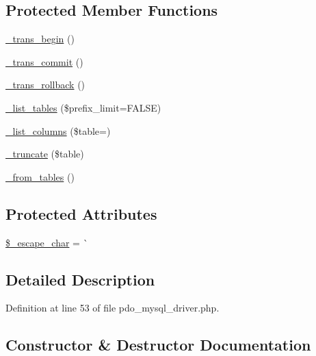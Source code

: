 \subsection*{Protected Member Functions}
\begin{DoxyCompactItemize}
\item 
\mbox{\hyperlink{class_c_i___d_b__pdo__mysql__driver_ac81ac882c1d54347d810199a15856aac}{\+\_\+trans\+\_\+begin}} ()
\item 
\mbox{\hyperlink{class_c_i___d_b__pdo__mysql__driver_a6fe7f373e0b11cfae23a5f41c0b35dda}{\+\_\+trans\+\_\+commit}} ()
\item 
\mbox{\hyperlink{class_c_i___d_b__pdo__mysql__driver_ad49a116b0776c26b53114c9093fd102a}{\+\_\+trans\+\_\+rollback}} ()
\item 
\mbox{\hyperlink{class_c_i___d_b__pdo__mysql__driver_a435c0f3ce54fe7daa178baa8532ebd54}{\+\_\+list\+\_\+tables}} (\$prefix\+\_\+limit=F\+A\+L\+SE)
\item 
\mbox{\hyperlink{class_c_i___d_b__pdo__mysql__driver_a7ccb7f9c301fe7f0a9db701254142b63}{\+\_\+list\+\_\+columns}} (\$table=\textquotesingle{}\textquotesingle{})
\item 
\mbox{\hyperlink{class_c_i___d_b__pdo__mysql__driver_aa029600528fc1ce660a23ff4b4667f95}{\+\_\+truncate}} (\$table)
\item 
\mbox{\hyperlink{class_c_i___d_b__pdo__mysql__driver_aef43f7e3e7b71d337ff3724c5eb14f10}{\+\_\+from\+\_\+tables}} ()
\end{DoxyCompactItemize}
\subsection*{Protected Attributes}
\begin{DoxyCompactItemize}
\item 
\mbox{\hyperlink{class_c_i___d_b__pdo__mysql__driver_aaec2fb0112850159063a8e47ad3aed6e}{\$\+\_\+escape\+\_\+char}} = \textquotesingle{}\`{}\textquotesingle{}
\end{DoxyCompactItemize}


\subsection{Detailed Description}


Definition at line 53 of file pdo\+\_\+mysql\+\_\+driver.\+php.



\subsection{Constructor \& Destructor Documentation}
\mbox{\label{class_c_i___d_b__pdo__mysql__driver_a9162320adff1a1a4afd7f2372f753a3e}} 
